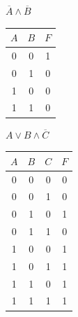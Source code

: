     \begin{minipage}[t]{0.22\textwidth}
        \centering
        \begin{enumerate}
            \setcounter{enumi}{0}
            \begin{spacing}{1.2}
                \item $\overline A \wedge \overline B$\\
            \end{spacing}
            \begin{tabular}{|c|c|c|}
                \hline
                $A$ & $B$ & $F$ \\
                \hline
                0   & 0   & 1   \\
                \hline
                0   & 1   & 0   \\
                \hline
                1   & 0   & 0   \\
                \hline
                1   & 1   & 0   \\
                \hline
            \end{tabular}
        \end{enumerate}
    \end{minipage}
    \begin{minipage}[t]{0.33\textwidth}
        \centering
        \begin{enumerate}
            \setcounter{enumi}{1}
            \begin{spacing}{1.2}
                \item $A \vee B \wedge \overline C$\\
            \end{spacing}
            \begin{tabular}{|c|c|c|c|}
                \hline
                $A$ & $B$ & $C$ & $F$ \\
                \hline
                0   & 0   & 0   & 0   \\
                \hline
                0   & 0   & 1   & 0   \\
                \hline
                0   & 1   & 0   & 1   \\
                \hline
                0   & 1   & 1   & 0   \\
                \hline
                1   & 0   & 0   & 1   \\
                \hline
                1   & 0   & 1   & 1   \\
                \hline
                1   & 1   & 0   & 1   \\
                \hline
                1   & 1   & 1   & 1   \\
                \hline
            \end{tabular}
        \end{enumerate}
    \end{minipage}
